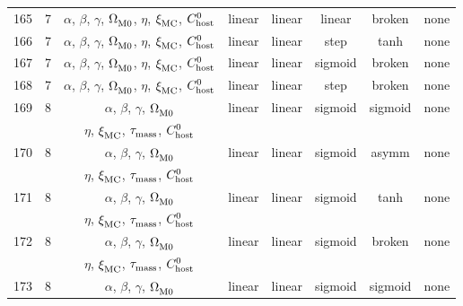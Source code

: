 \begin{longtable}{c c c c c c c c}
    165 & 7 & $\alpha$, $\beta$, $\gamma$, $\Omega_{\rm M0}^{}$, $\eta$, $\xi_{\rm MC}^{}$, $C_{\rm host}^{0}$ & linear & linear & linear & broken & none \\
    166 & 7 & $\alpha$, $\beta$, $\gamma$, $\Omega_{\rm M0}^{}$, $\eta$, $\xi_{\rm MC}^{}$, $C_{\rm host}^{0}$ & linear & linear & step & tanh & none \\
    167 & 7 & $\alpha$, $\beta$, $\gamma$, $\Omega_{\rm M0}^{}$, $\eta$, $\xi_{\rm MC}^{}$, $C_{\rm host}^{0}$ & linear & linear & sigmoid & broken & none \\
    168 & 7 & $\alpha$, $\beta$, $\gamma$, $\Omega_{\rm M0}^{}$, $\eta$, $\xi_{\rm MC}^{}$, $C_{\rm host}^{0}$ & linear & linear & step & broken & none \\
    169 & 8 & $\alpha$, $\beta$, $\gamma$, $\Omega_{\rm M0}^{}$ & linear & linear & sigmoid & sigmoid & none \\
    \multicolumn{1}{c}{} & \multicolumn{1}{c}{} & $\eta$, $\xi_{\rm MC}^{}$, $\tau_{\rm mass}^{}$, $C_{\rm host}^{0}$ & \multicolumn{1}{c}{} & \multicolumn{1}{c}{} & \multicolumn{1}{c}{} & \multicolumn{1}{c}{} & \multicolumn{1}{c}{} \\
    170 & 8 & $\alpha$, $\beta$, $\gamma$, $\Omega_{\rm M0}^{}$ & linear & linear & sigmoid & asymm & none \\
    \multicolumn{1}{c}{} & \multicolumn{1}{c}{} & $\eta$, $\xi_{\rm MC}^{}$, $\tau_{\rm mass}^{}$, $C_{\rm host}^{0}$ & \multicolumn{1}{c}{} & \multicolumn{1}{c}{} & \multicolumn{1}{c}{} & \multicolumn{1}{c}{} & \multicolumn{1}{c}{} \\
    171 & 8 & $\alpha$, $\beta$, $\gamma$, $\Omega_{\rm M0}^{}$ & linear & linear & sigmoid & tanh & none \\
    \multicolumn{1}{c}{} & \multicolumn{1}{c}{} & $\eta$, $\xi_{\rm MC}^{}$, $\tau_{\rm mass}^{}$, $C_{\rm host}^{0}$ & \multicolumn{1}{c}{} & \multicolumn{1}{c}{} & \multicolumn{1}{c}{} & \multicolumn{1}{c}{} & \multicolumn{1}{c}{} \\
    172 & 8 & $\alpha$, $\beta$, $\gamma$, $\Omega_{\rm M0}^{}$ & linear & linear & sigmoid & broken & none \\
    \multicolumn{1}{c}{} & \multicolumn{1}{c}{} & $\eta$, $\xi_{\rm MC}^{}$, $\tau_{\rm mass}^{}$, $C_{\rm host}^{0}$ & \multicolumn{1}{c}{} & \multicolumn{1}{c}{} & \multicolumn{1}{c}{} & \multicolumn{1}{c}{} & \multicolumn{1}{c}{} \\
    173 & 8 & $\alpha$, $\beta$, $\gamma$, $\Omega_{\rm M0}^{}$ & linear & linear & sigmoid & sigmoid & none \\

\end{longtable}
